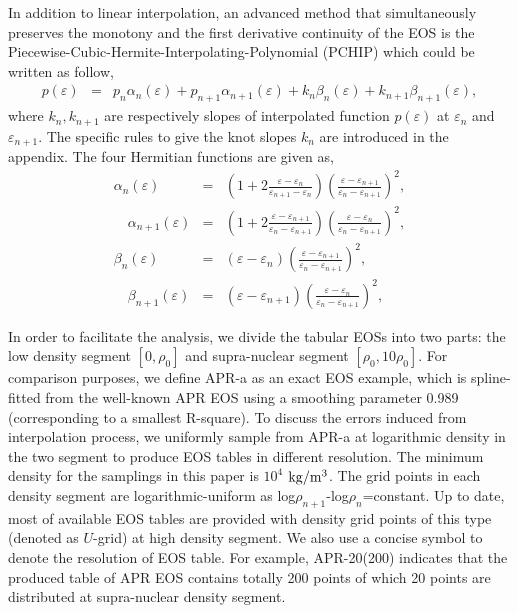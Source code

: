 \documentclass[preprint,tightenlines,eqsecnum,floats,aps,amsmath,amssymb,nofootinbib,prd,showpacs]{revtex4}
\begin{document}
In addition to linear interpolation, an advanced method that simultaneously preserves the monotony and the first derivative continuity of the EOS is the Piecewise-Cubic-Hermite-Interpolating-Polynomial (PCHIP) which could be written as follow,
\begin{eqnarray}
p\left( \varepsilon  \right) &=& {p_n}{\alpha _n}\left( \varepsilon  \right) + {p_{n + 1}}{\alpha _{n + 1}}\left( \varepsilon  \right) + {k_n}{\beta _n}\left( \varepsilon  \right) + {k_{n + 1}}{\beta _{n + 1}}\left( \varepsilon  \right),\label{pchipII}
\end{eqnarray}
where $k_{n},k_{n+1}$ are respectively slopes of interpolated function $p(\varepsilon)$ at $\varepsilon_n$ and $\varepsilon_{n+1}$. The specific rules to give the knot slopes $k_{n}$ are introduced in the appendix. The four Hermitian functions are given as,
\begin{eqnarray}
{\alpha _n}\left( \varepsilon  \right) &=& \left( {1 + 2\frac{{\varepsilon  - {\varepsilon _n}}}{{{\varepsilon _{n + 1}} - {\varepsilon _n}}}} \right){\left( {\frac{{\varepsilon  - {\varepsilon _{n + 1}}}}{{{\varepsilon _n} - {\varepsilon _{n + 1}}}}} \right)^2} ,\label{pchipI} \\
 \quad {\alpha _{n + 1}}\left( \varepsilon  \right) &=& \left( {1 + 2\frac{{\varepsilon  - {\varepsilon _{n + 1}}}}{{{\varepsilon _n} - {\varepsilon _{n + 1}}}}} \right){\left( {\frac{{\varepsilon  - {\varepsilon _n}}}{{{\varepsilon _n} - {\varepsilon _{n + 1}}}}} \right)^2},\\
{\beta _n}\left( \varepsilon  \right) &=& \left( {\varepsilon  - {\varepsilon _n}} \right){\left( {\frac{{\varepsilon  - {\varepsilon _{n + 1}}}}{{{\varepsilon _n} - {\varepsilon _{n + 1}}}}} \right)^2}, \\
\quad {\beta _{n + 1}}\left( \varepsilon  \right) &=& \left( {\varepsilon  - {\varepsilon _{n + 1}}} \right){\left( {\frac{{\varepsilon  - {\varepsilon _n}}}{{{\varepsilon _n} - {\varepsilon _{n + 1}}}}} \right)^2},
\end{eqnarray}


In order to facilitate the analysis, we divide the tabular EOSs into two parts: the low density segment $[0, \rho_0]$ and supra-nuclear segment $[\rho_0 , 10\rho_0]$. For comparison purposes, we define APR-a as an exact EOS example, which is spline-fitted from the well-known APR EOS using a smoothing parameter 0.989 (corresponding to a smallest R-square). To discuss the errors induced from interpolation process, we uniformly sample from APR-a at logarithmic density in the two segment to produce EOS tables in different resolution. The minimum density for the samplings in this paper is $10^4$ $\rm{kg/m^3}$. The grid points in each density segment are logarithmic-uniform as log$\rho_{n+1}$-log$\rho_n$=constant. Up to date, most of available EOS tables are provided with density grid points of this type (denoted as $U$-grid) at high density segment. We also use a concise symbol to denote the resolution of EOS table. For example, APR-20(200) indicates that the produced table of APR EOS contains totally 200 points of which 20 points are distributed at supra-nuclear density segment.
\end{document}
